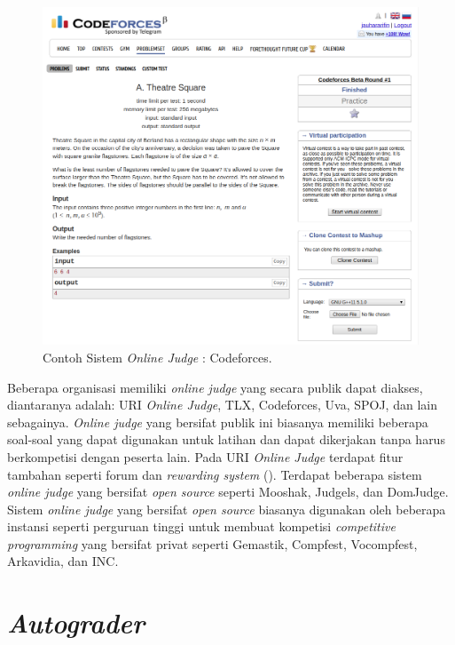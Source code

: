 \begin{figure}[ht]
	\centering
	\includegraphics[width=\textwidth]{images/codeforces}
	\caption{Contoh Sistem \textit{Online Judge} : Codeforces.}
	\label{fig:codeforces}
\end{figure}

\par Beberapa organisasi memiliki \textit{online judge} yang secara publik dapat diakses, diantaranya adalah: URI \textit{Online Judge}, TLX, Codeforces, Uva, SPOJ, dan lain sebagainya. \textit{Online judge} yang bersifat publik ini biasanya memiliki beberapa soal-soal yang dapat digunakan untuk latihan dan dapat dikerjakan tanpa harus berkompetisi dengan peserta lain. Pada URI \textit{Online Judge} terdapat fitur tambahan seperti forum dan \textit{rewarding system} (\cite{uriojpaper}). Terdapat beberapa sistem \textit{online judge} yang bersifat \textit{open source} seperti Mooshak, Judgels, dan DomJudge. Sistem \textit{online judge} yang bersifat \textit{open source} biasanya digunakan oleh beberapa instansi seperti perguruan tinggi untuk membuat kompetisi \textit{competitive programming} yang bersifat privat seperti Gemastik, Compfest, Vocompfest, Arkavidia, dan INC.

\section{\textit{Autograder}}

